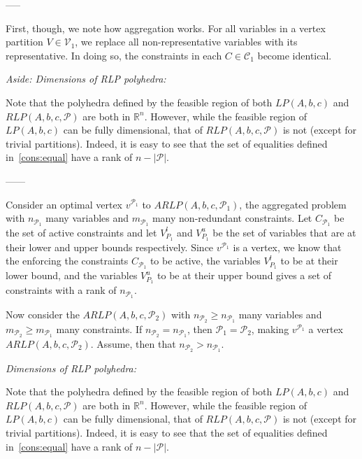 \documentclass[runningheads]{llncs}
\newcommand{\cP}{{\mathcal P}}
\newcommand{\cC}{{\mathcal C}}
\newcommand{\cV}{{\mathcal V}}
\begin{document}
 

 -----
 



First, though, we note how aggregation works. For all variables in a vertex partition $V \in \cV_1$, we replace all non-representative variables with its representative. In doing so, the constraints in each $C \in \cC_1$ become identical. 

{\em Aside: Dimensions of RLP polyhedra:}

Note that the polyhedra defined by the feasible region of both $LP(A,b,c)$ and
$RLP(A,b,c,\cP)$ are both in $\mathbb{R}^n$. However, while the feasible
region of $LP(A,b,c)$ can be fully dimensional, that of $RLP(A,b,c,\cP)$ is not
(except for trivial partitions). Indeed, it is easy to see that the set of
equalities defined in~\eqref{cons:equal} have a rank of $n - |\cP|$.


------



Consider an optimal vertex $v^{\cP_1}$ to $ARLP(A,b,c,\cP_1)$, the aggregated problem with $n_{\cP_1}$ many variables and $m_{\cP_1}$ many non-redundant constraints. Let $C_{\cP_1}$ be the set of active constraints and let $V_{P_1}^l$ and  $V_{P_1}^u$ be the set of variables that are at their lower and upper bounds respectively. Since $v^{\cP_1}$ is a vertex, we know that the enforcing the constraints $C_{\cP_1}$ to be active, the variables $V_{P_1}^l$ to be at their lower bound, and the variables $V_{P_1}^u$ to be at their upper bound gives a set of constraints with a rank of $n_{\cP_1}$.







Now consider the $ARLP(A,b,c,\cP_2)$ with $n_{\cP_2} \geq n_{\cP_1}$ many variables and $m_{\cP_2}\geq m_{\cP_1}$ many constraints. If $n_{\cP_2} = n_{\cP_1}$, then $\cP_1 = \cP_2$, making $v^{\cP_1}$  a vertex $ARLP(A,b,c,\cP_2)$. Assume, then that $n_{\cP_2} > n_{\cP_1}$. 
















{\em Dimensions of RLP polyhedra:}

Note that the polyhedra defined by the feasible region of both $LP(A,b,c)$ and
$RLP(A,b,c,\cP)$ are both in $\mathbb{R}^n$. However, while the feasible
region of $LP(A,b,c)$ can be fully dimensional, that of $RLP(A,b,c,\cP)$ is not
(except for trivial partitions). Indeed, it is easy to see that the set of
equalities defined in~\eqref{cons:equal} have a rank of $n - |\cP|$.
\end{document}
